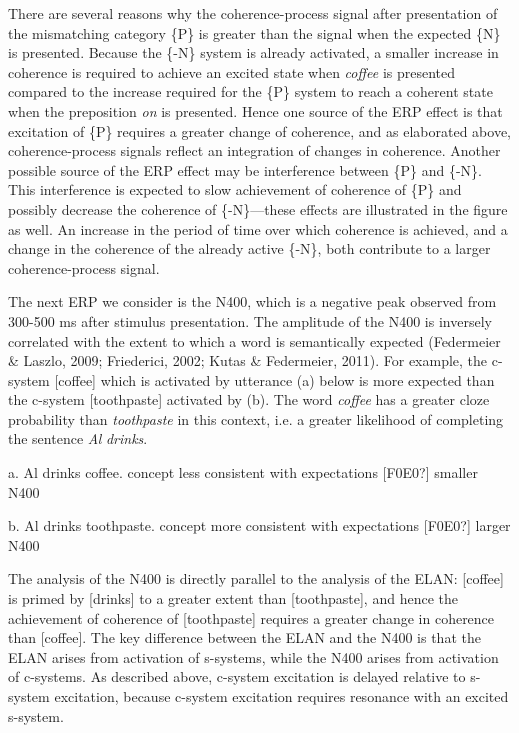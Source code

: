 There are several reasons why the coherence-process signal after presentation of the mismatching category \{P\} is greater than the signal when the expected \{N\} is presented. Because the \{-N\} system is already activated, a smaller increase in coherence is required to achieve an excited state when \textit{coffee} is presented compared to the increase required for the \{P\} system to reach a coherent state when the preposition \textit{on} is presented. Hence one source of the ERP effect is that excitation of \{P\} requires a greater change of coherence, and as elaborated above, coherence-process signals reflect an integration of changes in coherence. Another possible source of the ERP effect may be interference between \{P\} and \{-N\}. This interference is expected to slow achievement of coherence of \{P\} and possibly decrease the coherence of \{-N\}—these effects are illustrated in the figure as well. An increase in the period of time over which coherence is achieved, and a change in the coherence of the already active \{-N\}, both contribute to a larger coherence-process signal.

  The next ERP we consider is the N400, which is a negative peak observed from 300-500 ms after stimulus presentation. The amplitude of the N400 is inversely correlated with the extent to which a word is semantically expected (Federmeier \& Laszlo, 2009; Friederici, 2002; Kutas \& Federmeier, 2011). For example, the c-system [coffee] which is activated by utterance (a) below is more expected than the c-system [toothpaste] activated by (b). The word \textit{coffee} has a greater cloze probability than \textit{toothpaste} in this context, i.e. a greater likelihood of completing the sentence \textit{Al} \textit{drinks}.

a. Al drinks coffee.         concept less consistent with expectations [F0E0?] smaller N400

b. Al drinks toothpaste.    concept more consistent with expectations [F0E0?] larger N400

The analysis of the N400 is directly parallel to the analysis of the ELAN: [coffee] is primed by [drinks] to a greater extent than [toothpaste], and hence the achievement of coherence of [toothpaste] requires a greater change in coherence than [coffee]. The key difference between the ELAN and the N400 is that the ELAN arises from activation of s-systems, while the N400 arises from activation of c-systems. As described above, c-system excitation is delayed relative to s-system excitation, because c-system excitation requires resonance with an excited s-system.

